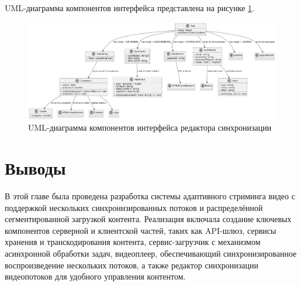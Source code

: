 	UML-диаграмма компонентов интерфейса представлена на рисунке \ref{fig:uml_sync}.

	\begin{figure}[ht!] 
		\center
		\includegraphics [scale=0.25] {my_folder/images//uml_sync}
		\caption{UML-диаграмма компонентов интерфейса редактора синхронизации} 
		\label{fig:uml_sync}  
	\end{figure}

\section{Выводы}

	В этой главе была проведена разработка системы адаптивного стриминга видео с поддержкой нескольких синхронизированных потоков и распределённой сегментированной загрузкой контента. Реализация включала создание ключевых компонентов серверной и клиентской частей, таких как API-шлюз, сервисы хранения и транскодирования контента, сервис-загрузчик с механизмом асинхронной обработки задач, видеоплеер, обеспечивающий синхронизированное воспроизведение нескольких потоков, а также редактор синхронизации видеопотоков для удобного управления контентом.
	